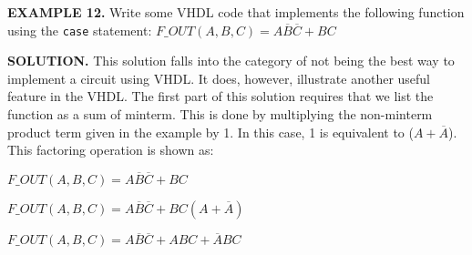 \begin{leftbar}
\noindent
\textbf{EXAMPLE 12.}
Write some VHDL code that implements the following function using the \texttt{case} statement:
$F\_OUT(A,B,C)=A\overline{B}\overline{C}+BC$
\end{leftbar}
\noindent
\textbf{SOLUTION.} This solution falls into the category of not being the best way to implement a circuit using VHDL. It does, however, illustrate another useful feature in the VHDL. The first part of this solution requires that we list the function as a sum of minterm. This is done by multiplying the non-minterm product term given in the example by 1. In this case, 1 is equivalent to ($A+\overline{A}$). This factoring operation is shown as:

$F\_OUT(A,B,C)=A\overline{B}\overline{C}+BC$

$F\_OUT(A,B,C)=A\overline{B}\overline{C}+BC (A+\overline{A})$

$F\_OUT(A,B,C)=A\overline{B}\overline{C}+ABC+\overline{A}BC$

